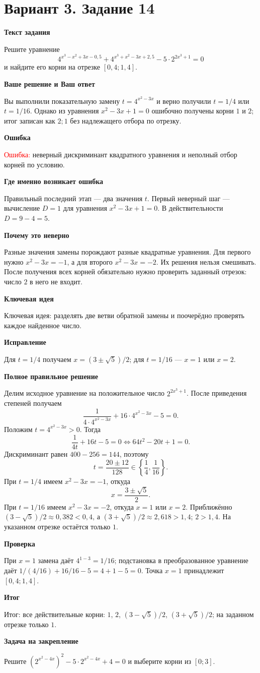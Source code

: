 \documentclass[11pt,a4paper]{article}
\newcommand{\Part}[1]{\par\medskip\noindent\textbf{#1}\par\smallskip}
\newcommand{\Task}[2]{\clearpage\phantomsection\label{task:#1}\section*{#2}}
\newcommand{\Err}[1]{\textcolor{red}{Ошибка:} #1}
\newcommand{\Idea}[1]{\textcolor{blue!60!black}{Ключевая идея:} #1}
\newcommand{\Result}[1]{\textcolor{teal!60!black}{Итог:} #1}
\begin{document}
\Task{v314}{Вариант 3. Задание 14}
\Part{Текст задания}
Решите уравнение
\[4^{x^3-x^2+3x-0{,}5}+4^{x^3+x^2-3x+2{,}5}-5\cdot2^{2x^3+1}=0\]
и найдите его корни на отрезке $[0{,}4;1{,}4]$.
\Part{Ваше решение и Ваш ответ}
Вы выполнили показательную замену $t=4^{x^2-3x}$ и верно получили $t=1/4$ или $t=1/16$. Однако из уравнения $x^2-3x+1=0$ ошибочно получены корни $1$ и $2$; итог записан как $2;1$ без надлежащего отбора по отрезку.
\Part{Ошибка}
\Err{неверный дискриминант квадратного уравнения и неполный отбор корней по условию.}
\Part{Где именно возникает ошибка}
Правильный последний этап --- два значения $t$. Первый неверный шаг --- вычисление $D=1$ для уравнения $x^2-3x+1=0$. В действительности $D=9-4=5$.
\Part{Почему это неверно}
Разные значения замены порождают разные квадратные уравнения. Для первого нужно $x^2-3x=-1$, а для второго $x^2-3x=-2$. Их решения нельзя смешивать. После получения всех корней обязательно нужно проверить заданный отрезок: число $2$ в него не входит.
\Part{Ключевая идея}
\Idea{разделять две ветви обратной замены и поочерёдно проверять каждое найденное число.}
\Part{Исправление}
Для $t=1/4$ получаем $x=(3\pm\sqrt5)/2$; для $t=1/16$ --- $x=1$ или $x=2$.
\Part{Полное правильное решение}
Делим исходное уравнение на положительное число $2^{2x^3+1}$. После приведения степеней получаем
\[\frac1{4\cdot4^{x^2-3x}}+16\cdot4^{x^2-3x}-5=0.\]
Положим $t=4^{x^2-3x}>0$. Тогда
\[\frac1{4t}+16t-5=0\iff64t^2-20t+1=0.\]
Дискриминант равен $400-256=144$, поэтому
\[t=\frac{20\pm12}{128}\in\left\{\frac14,\frac1{16}\right\}.\]
При $t=1/4$ имеем $x^2-3x=-1$, откуда
\[x=\frac{3\pm\sqrt5}{2}.\]
При $t=1/16$ имеем $x^2-3x=-2$, откуда $x=1$ или $x=2$. Приближённо $(3-\sqrt5)/2\approx0{,}382<0{,}4$, а $(3+\sqrt5)/2\approx2{,}618>1{,}4$; $2>1{,}4$. На указанном отрезке остаётся только $1$.
\Part{Проверка}
При $x=1$ замена даёт $4^{1-3}=1/16$; подстановка в преобразованное уравнение даёт $1/(4/16)+16/16-5=4+1-5=0$. Точка $x=1$ принадлежит $[0{,}4;1{,}4]$.
\Part{Итог}
\Result{все действительные корни: $1$, $2$, $(3-\sqrt5)/2$, $(3+\sqrt5)/2$; на заданном отрезке только $1$.}
\Part{Задача на закрепление}
Решите $(2^{x^2-4x})^2-5\cdot2^{x^2-4x}+4=0$ и выберите корни из $[0;3]$.
\end{document}
